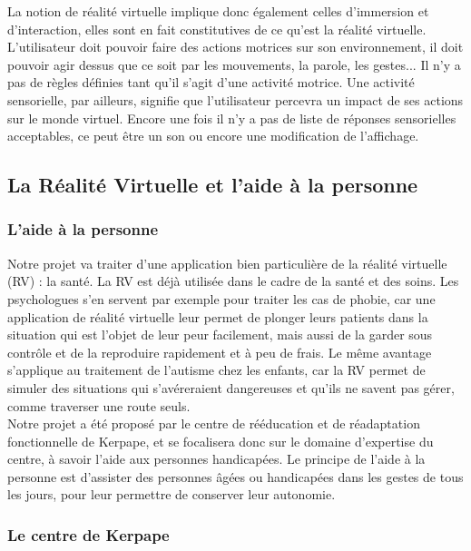 La notion de réalité virtuelle implique donc également celles d'immersion et d'interaction, elles sont en fait constitutives de ce qu'est la réalité virtuelle. L'utilisateur doit pouvoir faire des actions motrices sur son environnement, il doit pouvoir agir dessus que ce soit par les mouvements, la parole, les gestes... Il n'y a pas de règles définies tant qu'il s'agit d'une activité motrice.
Une activité sensorielle, par ailleurs, signifie que l'utilisateur percevra un impact de ses actions sur le monde virtuel. Encore une fois il n'y a pas de liste de réponses sensorielles acceptables, ce peut être un son ou encore une modification de l'affichage.


\subsection{La Réalité Virtuelle et l'aide à la personne}

\subsubsection{L'aide à la personne}

Notre projet va traiter d'une application bien particulière de la réalité virtuelle (RV) : la santé. La RV est déjà utilisée dans le cadre de la santé et des soins. Les psychologues s'en servent par exemple pour traiter les cas de phobie, car une application de réalité virtuelle leur permet de plonger leurs patients dans la situation qui est l'objet de leur peur facilement, mais aussi de la garder sous contrôle et de la reproduire rapidement et à peu de frais. Le même avantage s'applique au traitement de l'autisme chez les enfants, car la RV permet de simuler des situations qui s'avéreraient dangereuses et qu'ils ne savent pas gérer, comme traverser une route seuls.\cite{traiteRV4}\\

Notre projet a été proposé par le centre de rééducation et de réadaptation fonctionnelle de Kerpape, et se focalisera donc sur le domaine d'expertise du centre, à savoir l'aide aux personnes handicapées. Le principe de l'aide à la personne est d'assister des personnes âgées ou handicapées dans les gestes de tous les jours, pour leur permettre de conserver leur autonomie.

\subsubsection{Le centre de Kerpape}

